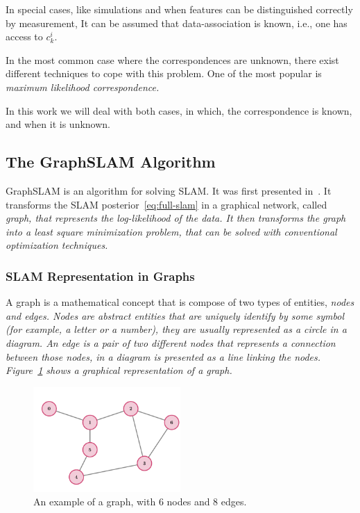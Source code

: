 In special cases, like simulations and when features can be distinguished correctly by measurement, It can be assumed that data-association is known, i.e., one has access to $c_k^i$. 

In the most common case where the correspondences are unknown, there exist different techniques to cope with this problem. One of the most popular is \it{maximum likelihood correspondence}.

In this work we will deal with both cases, in which, the correspondence is known, and when it is unknown.

\subsection{The GraphSLAM Algorithm}
\label{sec:graphslam-description}

GraphSLAM is an algorithm for solving SLAM. It was first presented in~\cite{graphslam}. It transforms the SLAM posterior~\eqref{eq:full-slam} in a graphical network, called \it{graph}, that represents the log-likelihood of the data. It then transforms the graph into a least square minimization problem, that can be solved with conventional optimization techniques.

\subsubsection{SLAM Representation in Graphs}

A graph is a mathematical concept that is compose of two types of entities, \it{nodes} and \it{edges}. Nodes are abstract entities that are uniquely identify by some symbol (for example, a letter or a number), they are usually represented as a circle in a diagram. An edge is a pair of two different nodes that represents a connection between those nodes, in a diagram is presented as a line linking the nodes. Figure~\ref{fig:graph} shows a graphical representation of a graph.

\begin{figure}[htbp!]
    \centering
    \includegraphics[width=0.5\textwidth]{tikz/graph.pdf}
    \caption[An example of a graph]{An example of a graph, with 6 nodes and 8 edges.}
    \label{fig:graph}
\end{figure}  

